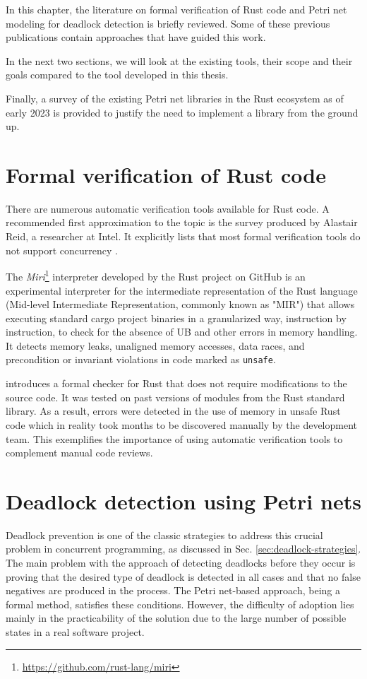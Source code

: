 \documentclass[../Thesis.tex]{subfiles}
\begin{document}
In this chapter, the literature on formal verification of Rust code
and Petri net modeling for deadlock detection is briefly reviewed.
Some of these previous publications contain approaches
that have guided this work.

In the next two sections, we will look at the existing tools,
their scope and their goals compared to the tool developed in this thesis.

Finally, a survey of the existing Petri net libraries in the Rust ecosystem
as of early 2023 is provided to justify the need to implement a library
from the ground up.

\section{Formal verification of Rust code}

There are numerous automatic verification tools available for Rust code.
A recommended first approximation to the topic is
the survey produced by Alastair Reid, a researcher at Intel.
It explicitly lists that most formal verification tools
do not support concurrency \cite{reid2021}.

The \emph{Miri}\footnote{\url{https://github.com/rust-lang/miri}} interpreter
developed by the Rust project on GitHub is an experimental interpreter
for the intermediate representation of the Rust language
(Mid-level Intermediate Representation, commonly known as "\acrshort{MIR}")
that allows executing standard cargo project binaries
in a granularized way, instruction by instruction,
to check for the absence of \acrfull{UB}
and other errors in memory handling.
It detects memory leaks, unaligned memory accesses, data races,
and precondition or invariant violations in code marked as \texttt{unsafe}.

\cite{toman2015crust} introduces a formal checker for Rust
that does not require modifications to the source code.
It was tested on past versions of modules from the Rust standard library.
As a result, errors were detected in the use of memory in unsafe Rust code
which in reality took months to be discovered manually by the development team.
This exemplifies the importance of using automatic verification tools
to complement manual code reviews.

\section{Deadlock detection using Petri nets}

Deadlock prevention is one of the classic strategies
to address this crucial problem in concurrent programming,
as discussed in Sec. \ref{sec:deadlock-strategies}.
The main problem with the approach of detecting deadlocks before they occur
is proving that the desired type of deadlock is detected in all cases
and that no false negatives are produced in the process.
The Petri net-based approach, being a formal method, satisfies these conditions.
However, the difficulty of adoption lies mainly in the practicability of the solution
due to the large number of possible states in a real software project.
\end{document}
